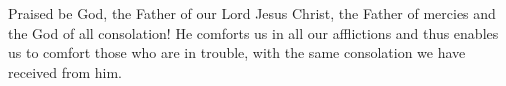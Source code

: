 \lettrine[lines=3]{P}{}raised be God, the Father of our Lord Jesus Christ, the Father of mercies and the God of all consolation! He comforts us in all our afflictions and thus enables us to comfort those who are in trouble, with the same consolation we have received from him.